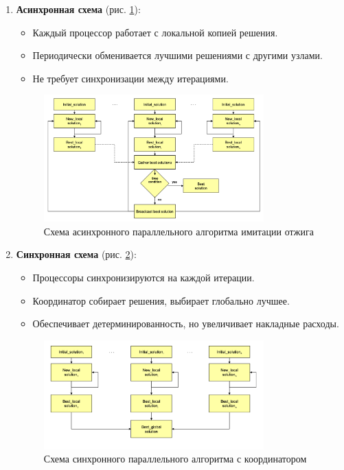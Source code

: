 \begin{enumerate}
    \item \textbf{Асинхронная схема} (рис. \ref{fig:async}): 
    \begin{itemize}
        \item Каждый процессор работает с локальной копией решения.
        \item Периодически обменивается лучшими решениями с другими узлами.
        \item Не требует синхронизации между итерациями.
    \end{itemize}
    
    \begin{figure}[h]
        \centering
        \includegraphics[width=0.8\textwidth]{pics/IOpar1.png}
        \caption{Схема асинхронного параллельного алгоритма имитации отжига}
        \label{fig:async}
    \end{figure}

    \item \textbf{Синхронная схема} (рис. \ref{fig:sync}):
    \begin{itemize}
        \item Процессоры синхронизируются на каждой итерации.
        \item Координатор собирает решения, выбирает глобально лучшее.
        \item Обеспечивает детерминированность, но увеличивает накладные расходы.
    \end{itemize}
    
    \begin{figure}[h]
        \centering
        \includegraphics[width=0.8\textwidth]{pics/IOpar2.png}
        \caption{Схема синхронного параллельного алгоритма с координатором}
        \label{fig:sync}
    \end{figure}
\end{enumerate}

